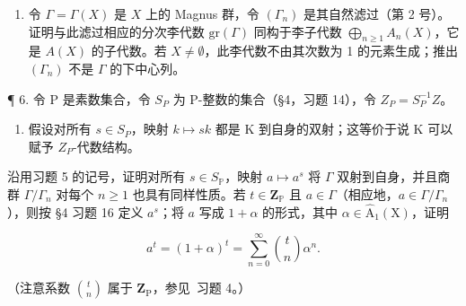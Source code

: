\begin{enumerate}
\def\labelenumi{\arabic{enumi}.}
\setcounter{enumi}{4}
\tightlist
\item
  令 \(\Gamma = \Gamma(X)\) 是 \(X\) 上的 Magnus 群，令 \((\Gamma_n)\) 是其自然滤过（第 2 号）。证明与此滤过相应的分次李代数 \(\mathrm{gr}(\Gamma)\) 同构于李子代数 \(\bigoplus_{n\geqslant 1}A_n(X)\)，它是 \(A(X)\) 的子代数。若 \(X\neq \emptyset\)，此李代数不由其次数为 1 的元素生成；推出 \((\Gamma_n)\) 不是 \(\Gamma\) 的下中心列。
\end{enumerate}

¶ 6. 令 P 是素数集合，令 \(S_P\) 为 P-整数的集合（§4，习题 14），令 \(Z_P = S_P^{-1}Z\)。

\begin{enumerate}
\def\labelenumi{(\alph{enumi})}
\tightlist
\item
  假设对所有 \(s \in S_{P}\)，映射 \(k \mapsto sk\) 都是 K 到自身的双射；这等价于说 K 可以赋予 \(Z_{P}\)-代数结构。
\end{enumerate}

沿用习题 5 的记号，证明对所有 \(s \in S_{\mathbb{P}}\)，映射 \(a \mapsto a^s\) 将 \(\Gamma\) 双射到自身，并且商群 \(\Gamma / \Gamma_n\) 对每个 \(n \geqslant 1\) 也具有同样性质。若 \(t \in \mathbf{Z}_{\mathbb{P}}\) 且 \(a \in \Gamma\)（相应地，\(a \in \Gamma / \Gamma_n\)），则按 §4 习题 16 定义 \(a^s\)；将 \(a\) 写成 \(1 + \alpha\) 的形式，其中 \(\alpha \in \hat{\mathrm{A}}_1(\mathrm{X})\)，证明

\[
a ^ {t} = (1 + \alpha) ^ {t} = \sum_ {n = 0} ^ {\infty} \binom {t} {n} \alpha^ {n}.
\]

（注意系数 \(\binom{t}{n}\) 属于 \(\mathbf{Z}_{\mathrm{P}}\)，参见~习题 4。）

